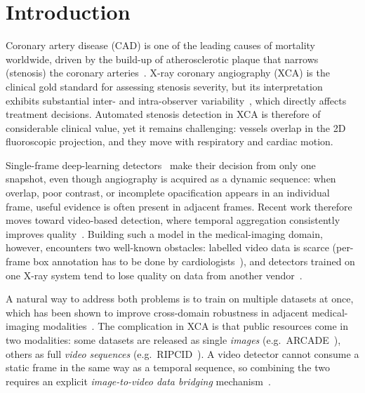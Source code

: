 \documentclass[conference]{IEEEtran}
\begin{document}
\section{Introduction}

Coronary artery disease (CAD) is one of the leading causes of mortality worldwide, driven by the build-up of atherosclerotic plaque that narrows (stenosis) the coronary arteries~\cite{popov2022reviewmodernapproachescoronary}. X-ray coronary angiography (XCA) is the clinical gold standard for assessing stenosis severity, but its interpretation exhibits substantial inter- and intra-observer variability~\cite{zir1976interobserver, cardiovascular}, which directly affects treatment decisions. Automated stenosis detection in XCA is therefore of considerable clinical value, yet it remains challenging: vessels overlap in the 2D fluoroscopic projection, and they move with respiratory and cardiac motion.

Single-frame deep-learning detectors~\cite{MOON2021105819, Danilov2021, attentionstenosis, kupeli2025yolo, aipoweredrealtime, choudhary2026odysseiopensourceendtoendframework} make their decision from only one snapshot, even though angiography is acquired as a dynamic sequence: when overlap, poor contrast, or incomplete opacification appears in an individual frame, useful evidence is often present in adjacent frames. Recent work therefore moves toward video-based detection, where temporal aggregation consistently improves quality~\cite{fvcm, PANG2021101900, HAN2023106546, STQD-Det, li2025ltyolo}. Building such a model in the medical-imaging domain, however, encounters two well-known obstacles: labelled video data is scarce (per-frame box annotation has to be done by cardiologists~\cite{huang2026vasomim}), and detectors trained on one X-ray system tend to lose quality on data from another vendor~\cite{cardiovascular}.

A natural way to address both problems is to train on multiple datasets at once, which has been shown to improve cross-domain robustness in adjacent medical-imaging modalities~\cite{liu2020msnet, tetteh2021multidomain}. The complication in XCA is that public resources come in two modalities: some datasets are released as single \emph{images} (e.g.\ ARCADE~\cite{popov2024arcade}), others as full \emph{video sequences} (e.g.\ RIPCID~\cite{Danilov2021}). A video detector cannot consume a static frame in the same way as a temporal sequence, so combining the two requires an explicit \emph{image-to-video data bridging} mechanism~\cite{li2025imagetovideo}.
\end{document}
